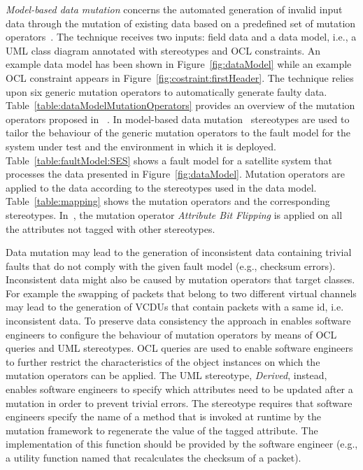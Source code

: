 \emph{Model-based data mutation} concerns the automated generation of invalid input data through the mutation of existing data based on a predefined set of mutation operators~\cite{di2015generating}.
The technique receives two inputs: field data and a data model, i.e., a UML class diagram annotated with stereotypes and OCL constraints. 
An example data model has been shown in Figure~\ref{fig:dataModel} while an example OCL constraint appears in Figure~\ref{fig:costraint:firstHeader}. 
The technique relies upon six generic mutation operators to automatically generate faulty data. 
Table~\ref{table:dataModelMutationOperators} provides an overview of the mutation operators proposed in ~\cite{di2015generating}.
In model-based data mutation~\cite{di2015generating} stereotypes are used to tailor the behaviour of the generic mutation operators to the fault model for the system under test and the environment in which it is deployed. 
Table~\ref{table:faultModel:SES} shows a fault model for a satellite system that processes the data presented in Figure~\ref{fig:dataModel}.
Mutation operators are applied to the data according to the stereotypes used in the data model.
Table~\ref{table:mapping} shows the mutation operators and the corresponding stereotypes. In~\cite{di2015generating}, the mutation operator \emph{Attribute Bit Flipping} is applied on all the attributes not tagged with other stereotypes. 







Data mutation may lead to the generation of inconsistent data containing trivial faults that do not comply with the given fault model (e.g., checksum errors). 
Inconsistent data might also be caused by mutation operators that target classes. For example the swapping of packets that belong to two different virtual channels may lead to the generation of VCDUs that contain packets with a same id, i.e. inconsistent data. To preserve data consistency the approach in \cite{di2015generating} enables software engineers to configure the behaviour of mutation operators by means of OCL queries and UML stereotypes. OCL queries are used to enable software engineers to further restrict the characteristics of the object instances on which the mutation operators can be applied.   The UML stereotype, \emph{Derived}, instead, enables software engineers to specify which attributes need to be updated after a mutation in order to prevent trivial errors. The stereotype requires that software engineers specify the name of a method that is invoked at runtime by the mutation framework to regenerate the value of the tagged attribute. The implementation of this function should be provided by the software engineer (e.g., a utility function named that recalculates the checksum of a packet). 



